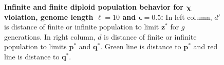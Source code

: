 \begin{figure}[h]
\begin{center}
\hspace{-3em}%
\vspace{-0.5em}  \hspace{-3em}%


\caption[\textbf{Infinite and finite diploid population behavior for $\bm{\chi}$ violation, genome length $\ell = 10$ and $\bm{\epsilon} = 0.5$}]{\textbf{Infinite and finite diploid population behavior for $\bm{\chi}$ violation, genome length $\ell = 10$ and $\bm{\epsilon} = 0.5$:} 
  In left column, $d'$ is distance of finite or infinite population to limit $\bm{z}^\ast$ for $g$ generations. In right column, $d$ is distance of finite or infinite population to limits $\bm{p}^\ast$ and $\bm{q}^\ast$. Green line is distance to $\bm{p}^\ast$ and red line is distance to $\bm{q}^\ast$.}
\label{oscillation_10d_vio_chi_0.5}
\end{center}
\end{figure}

